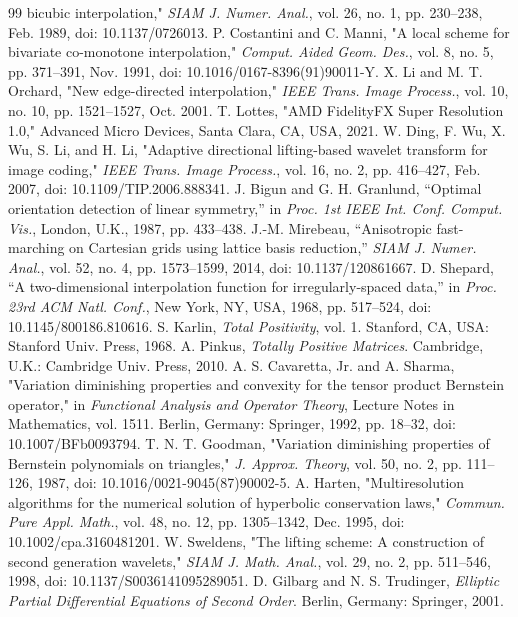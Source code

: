 \documentclass[journal]{IEEEtran}
\begin{document}
\begin{thebibliography}{99}
bicubic interpolation," \emph{SIAM J. Numer. Anal.}, vol. 26, no. 1,
pp. 230--238, Feb. 1989, doi: 10.1137/0726013.
P. Costantini and C. Manni, "A local scheme for bivariate co-monotone
interpolation," \emph{Comput. Aided Geom. Des.}, vol. 8, no. 5,
pp. 371--391, Nov. 1991, doi: 10.1016/0167-8396(91)90011-Y.
X. Li and M. T. Orchard, "New edge-directed interpolation," \emph{IEEE
Trans. Image Process.}, vol. 10, no. 10, pp. 1521--1527, Oct. 2001.
T. Lottes, "AMD FidelityFX Super Resolution 1.0," Advanced Micro Devices,
Santa Clara, CA, USA, 2021.
W. Ding, F. Wu, X. Wu, S. Li, and H. Li, "Adaptive directional
lifting-based wavelet transform for image coding," \emph{IEEE Trans. Image
Process.}, vol. 16, no. 2, pp. 416--427, Feb. 2007,
doi: 10.1109/TIP.2006.888341.
J. Bigun and G. H. Granlund, ``Optimal orientation detection of linear
symmetry,'' in \emph{Proc. 1st IEEE Int. Conf. Comput. Vis.}, London, U.K.,
1987, pp. 433--438.
J.-M. Mirebeau, ``Anisotropic fast-marching on Cartesian grids using lattice
basis reduction,'' \emph{SIAM J. Numer. Anal.}, vol. 52, no. 4,
pp. 1573--1599, 2014, doi: 10.1137/120861667.
D. Shepard, ``A two-dimensional interpolation function for irregularly-spaced
data,'' in \emph{Proc. 23rd ACM Natl. Conf.}, New York, NY, USA, 1968,
pp. 517--524, doi: 10.1145/800186.810616.
S. Karlin, \emph{Total Positivity}, vol. 1. Stanford, CA, USA: Stanford
Univ. Press, 1968.
A. Pinkus, \emph{Totally Positive Matrices}. Cambridge, U.K.: Cambridge
Univ. Press, 2010.
A. S. Cavaretta, Jr. and A. Sharma, "Variation diminishing properties and
convexity for the tensor product Bernstein operator," in \emph{Functional
Analysis and Operator Theory}, Lecture Notes in Mathematics, vol. 1511.
Berlin, Germany: Springer, 1992, pp. 18--32,
doi: 10.1007/BFb0093794.
T. N. T. Goodman, "Variation diminishing properties of Bernstein
polynomials on triangles," \emph{J. Approx. Theory}, vol. 50, no. 2,
pp. 111--126, 1987, doi: 10.1016/0021-9045(87)90002-5.
A. Harten, "Multiresolution algorithms for the numerical solution of
hyperbolic conservation laws," \emph{Commun. Pure Appl. Math.}, vol. 48,
no. 12, pp. 1305--1342, Dec. 1995,
doi: 10.1002/cpa.3160481201.
W. Sweldens, "The lifting scheme: A construction of second generation
wavelets," \emph{SIAM J. Math. Anal.}, vol. 29, no. 2, pp. 511--546, 1998,
doi: 10.1137/S0036141095289051.
D. Gilbarg and N. S. Trudinger, \emph{Elliptic Partial Differential Equations
of Second Order}. Berlin, Germany: Springer, 2001.
\end{thebibliography}
\end{document}
